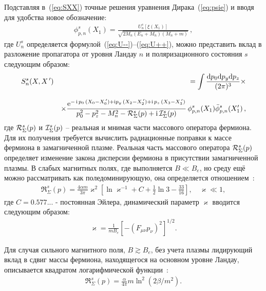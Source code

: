 Подставляя в~(\ref{eq:SXX}) точные решения уравнения Дирака~(\ref{eq:psie}) и вводя для удобства новое обозначение:
\begin{eqnarray}
\phi^{s}_{p, n} (X_1) =   \frac{U^s_{n} [\xi(X_1)]}
{\sqrt{2 M_n (E_{n} + M_n)(M_n + m)}} \, ,
\label{eq:phi_psi}
\end{eqnarray}
%
\noindent где $U^s_{n}$ определяется формулой~(\ref{eq:U--})--(\ref{eq:U++}), 
можно представить вклад в разложение пропагатора от уровня Ландау $n$ и 
поляризационного состояния $s$ следующим образом:
\begin{eqnarray}
\label{eq:propagator}
S^{s}_n (X, X^{\,\prime}) && =  \int \frac{\mathrm{d} p_0 \mathrm{d} p_y \mathrm{d} p_z}{(2\pi)^3} \times
\\[3mm]
\nonumber
&& \times \frac{\mathrm{e}^{- \, \mathrm{i} \,  p_0 \,(X_0 - X^{\,\prime}_0) + 
		\mathrm{i} p_y \,(X_2 - X^{\,\prime}_2) +  \mathrm{i} \,  p_z \,(X_3 - X^{\,\prime}_3)}}
{p_0^2 - p_z^2 - M_n^2 - {\cal R}^{s}_\Sigma (p) + \mathrm{i}\, {\cal I}^{s}_\Sigma (p)}
\, \phi^{s}_{p, n} (X_1) \bar \phi^{s}_{p, n} (X'_1) \, ,
\end{eqnarray}
где ${\cal R}^{s}_\Sigma (p)$ и ${\cal I}^{s}_\Sigma (p)$ -- реальная и мнимая части массового оператора фермиона.  Для их получения требуется вычислить радиационные поправки к массе фермиона в замагниченной плазме. Реальная часть массового оператора ${\cal R}^{s}_\Sigma (p)$ определяет изменение закона дисперсии фермиона в присутствии замагниченной плазмы. В слабых магнитных полях, где выполняется $B\ll B_e$, но среду ещё можно рассматривать как поледоминирующую, она определяется 
отношением~\cite{Ritus1969}:
%
\begin{eqnarray}
\label{eq:Re1}
\Re^{s}_\Sigma (p) = \frac{4\alpha m}{3\pi} \varkappa^2 \left [ \ln 
\varkappa^{-1} + C + \frac{1}{2} \ln 3 - \frac{33}{16} \right],\quad 
\varkappa\ll 1,
\end{eqnarray}
\noindent где $C = 0.577...$ - постоянная Эйлера, динамический параметр $\varkappa$ вводится следующим образом:
%
\begin{eqnarray}
\varkappa = \frac{1}{m B_e} [-(F_{\mu\nu} p_{\nu})^2]^{1/2}.
\end{eqnarray}
%

Для случая сильного магнитного поля, $B\gtrsim B_e$, без учета плазмы лидирующий вклад в  сдвиг массы фермиона, находящегося на основном уровне Ландау, описывается квадратом логарифмической функции~\cite{Jancovici:1969}:
\begin{eqnarray}
\label{eq:Re2}
\Re^{s}_\Sigma (p) = \frac{\alpha}{4\pi} m \ln^2 (2\beta/m^2).
\end{eqnarray}
%

